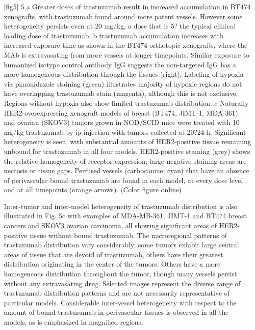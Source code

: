 [fig5]
5
a Greater doses of trastuzumab result in increased accumulation in BT474 xenografts, with trastuzumab found around more patent vessels.
However some heterogeneity persists even at 20 mg/kg, a dose that is 5? the typical clinical loading dose of trastuzumab.
b trastuzumab accumulation increases with increased exposure time as shown in the BT474 orthotopic xenografts, where the MAb is extravasating from more vessels at longer timepoints.
Similar exposure to humanized isotype control antibody IgG suggests the non-targeted IgG has a more homogeneous distribution through the tissues (right).
Labeling of hypoxia via pimonidazole staining (green) illustrates majority of hypoxic regions do not have overlapping trastuzumab stain (magenta), although this is not exclusive.
Regions without hypoxia also show limited trastuzumab distribution.
c Naturally HER2-overexpressing xenograft models of breast (BT474, JIMT-1, MDA-361) and ovarian (SKOV3) tumors grown in NOD/SCID mice were treated with 10 mg/kg trastuzumab by ip injection with tumors collected at 20?24 h.
Significant heterogeneity is seen, with substantial amounts of HER2-positive tissue remaining unbound for trastuzumab in all four models.
HER2-positive staining (grey) shows the relative homogeneity of receptor expression; large negative staining areas are necrosis or tissue gaps.
Perfused vessels (carbocanine; cyan) that have an absence of perivascular bound trastuzumab are found in each model, at every dose level and at all timepoints (orange arrows).
(Color figure online)

Inter-tumor and inter-model heterogeneity of trastuzumab distribution is also illustrated in Fig.
5c with examples of MDA-MB-361, JIMT-1 and BT474 breast cancers and SKOV3 ovarian carcinoma, all showing significant areas of HER2-positive tissue without bound trastuzumab.
The microregional patterns of trastuzumab distribution vary considerably; some tumors exhibit large central areas of tissue that are devoid of trastuzumab, others have their greatest distribution originating in the center of the tumors.
Others have a more homogeneous distribution throughout the tumor, though many vessels persist without any extravasating drug.
Selected images represent the diverse range of trastuzumab distribution patterns and are not necessarily representative of particular models.
Considerable inter-vessel heterogeneity with respect to the amount of bound trastuzumab in perivascular tissues is observed in all the models, as is emphasized in magnified regions.


